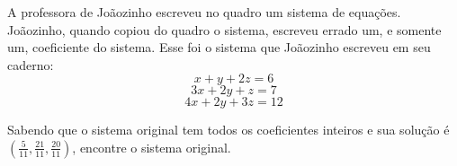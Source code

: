 A professora de Joãozinho escreveu no quadro um sistema de equações.
Joãozinho, quando copiou do quadro o sistema, escreveu errado um, e somente um, coeficiente do sistema.
Esse foi o sistema que Joãozinho escreveu em seu caderno:
$$ x + y + 2z = 6 $$
$$ 3x + 2y + z = 7 $$
$$ 4x + 2y + 3z = 12 $$

Sabendo que o sistema original tem todos os coeficientes inteiros e sua solução é $\left(\frac{5}{11}, \frac{21}{11}, \frac{20}{11}\right)$, encontre o sistema original.
